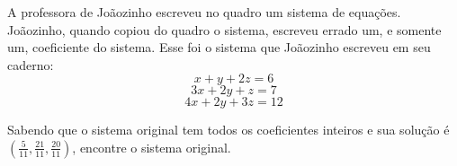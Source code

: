 A professora de Joãozinho escreveu no quadro um sistema de equações.
Joãozinho, quando copiou do quadro o sistema, escreveu errado um, e somente um, coeficiente do sistema.
Esse foi o sistema que Joãozinho escreveu em seu caderno:
$$ x + y + 2z = 6 $$
$$ 3x + 2y + z = 7 $$
$$ 4x + 2y + 3z = 12 $$

Sabendo que o sistema original tem todos os coeficientes inteiros e sua solução é $\left(\frac{5}{11}, \frac{21}{11}, \frac{20}{11}\right)$, encontre o sistema original.
